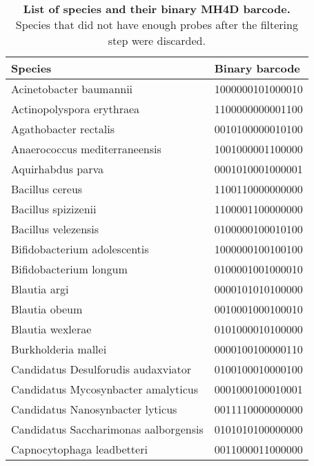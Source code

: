 \documentclass[10pt,letterpaper]{article}
\begin{document}
{\begin{longtable}
\end{longtable}

\begin{longtable}
{| p{} | p{} |} 
\caption{\textbf{List of species and their binary MH4D barcode.} Species that did not have enough probes after the filtering step were discarded.} %
\label{tableS2}
\hline
\hline
\textbf{Species}                      & \textbf{Binary barcode} \\ \hline
Acinetobacter baumannii               & 1000000101000010        \\ \hline
Actinopolyspora erythraea             & 1100000000001100        \\ \hline
Agathobacter rectalis                 & 0010100000010100        \\ \hline
Anaerococcus mediterraneensis         & 1001000001100000        \\ \hline
Aquirhabdus parva                     & 0001010001000001        \\ \hline
Bacillus cereus                       & 1100110000000000        \\ \hline
Bacillus spizizenii                   & 1100001100000000        \\ \hline
Bacillus velezensis                   & 0100000100010100        \\ \hline
Bifidobacterium adolescentis          & 1000000100100100        \\ \hline
Bifidobacterium longum                & 0100001001000010        \\ \hline
Blautia argi                          & 0000101010100000        \\ \hline
Blautia obeum                         & 0010001000100010        \\ \hline
Blautia wexlerae                      & 0101000010100000        \\ \hline
Burkholderia mallei                   & 0000100100000110        \\ \hline
Candidatus Desulforudis audaxviator   & 0100100010000100        \\ \hline
Candidatus Mycosynbacter amalyticus   & 0001000100010001        \\ \hline
Candidatus Nanosynbacter lyticus      & 0011110000000000        \\ \hline
Candidatus Saccharimonas aalborgensis & 0101010100000000        \\ \hline
Capnocytophaga leadbetteri            & 0011000011000000        \\ \hline

\end{longtable}}
\end{document}
